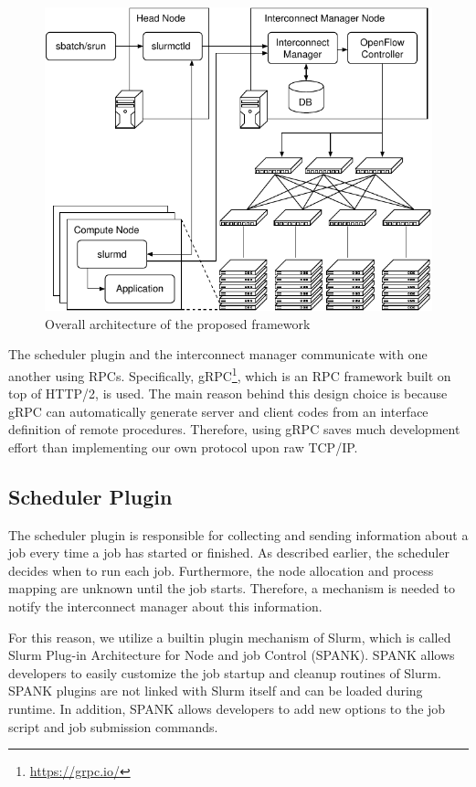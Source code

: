 \documentclass[graybox]{svmult}
\begin{document}
\begin{figure}
    \centering
    \includegraphics{architecture}
    \caption{Overall architecture of the proposed framework}%
    \label{kt:fig:architecture}
\end{figure}

The scheduler plugin and the interconnect manager communicate with one another
using RPCs. Specifically, gRPC\footnote{\url{https://grpc.io/}}, which is an
RPC framework built on top of HTTP/2, is used. The main reason behind this
design choice is because gRPC can automatically generate server and client
codes from an interface definition of remote procedures. Therefore, using gRPC
saves much development effort than implementing our own protocol upon raw
TCP/IP\@.

\subsection{Scheduler Plugin}

The scheduler plugin is responsible for collecting and sending information
about a job every time a job has started or finished. As described earlier,
the scheduler decides when to run each job. Furthermore, the node allocation
and process mapping are unknown until the job starts. Therefore, a mechanism
is needed to notify the interconnect manager about this information.

For this reason, we utilize a builtin plugin mechanism of Slurm, which is
called Slurm Plug-in Architecture for Node and job Control (SPANK). SPANK
allows developers to easily customize the job startup and cleanup routines of
Slurm. SPANK plugins are not linked with Slurm itself and can be loaded during
runtime. In addition, SPANK allows developers to add new options to the job
script and job submission commands.
\end{document}
